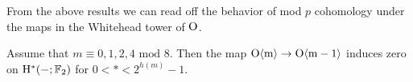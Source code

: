 From the above results we can read off the behavior of mod $p$ cohomology under the maps in the Whitehead tower of $\mathrm{O}$.

\begin{cor}\label{cor:zerocohmap}
	Assume that $m \equiv 0,1,2,4 \text{ mod } 8$. Then the map $\mathrm{O}\mathrm{\langle m \rangle} \to \mathrm{O \langle m -1 \rangle}$ induces zero on $\mathrm{H}^* (-; \operatorname{\mathbb{F}}_2)$ for $0 < * < 2^{h(m)} - 1$.
\end{cor}

